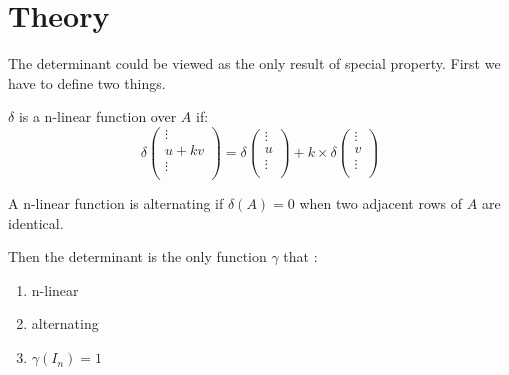 \section{Theory}

The determinant could be viewed as the only result of special property. First we have to define two things.

\begin{definition}
    $\delta$ is a n-linear function over $A$ if:
    \begin{equation}
        \delta \begin{pmatrix}
            \vdots \\
            u + kv \\
            \vdots \\
        \end{pmatrix} = \delta \begin{pmatrix}
            \vdots \\
            u \\
            \vdots \\
        \end{pmatrix} + k \times \delta \begin{pmatrix}
            \vdots \\
            v \\
            \vdots \\
        \end{pmatrix} 
    \end{equation}
\end{definition}


\begin{definition}[alternating]
    A n-linear function is alternating if $\delta (A) = 0$ when two adjacent rows of $A$ are identical.
\end{definition}

Then the determinant is the only function $\gamma$ that :
\begin{enumerate}
    \item n-linear
    \item alternating
    \item $\gamma(I_n) = 1$
\end{enumerate}

